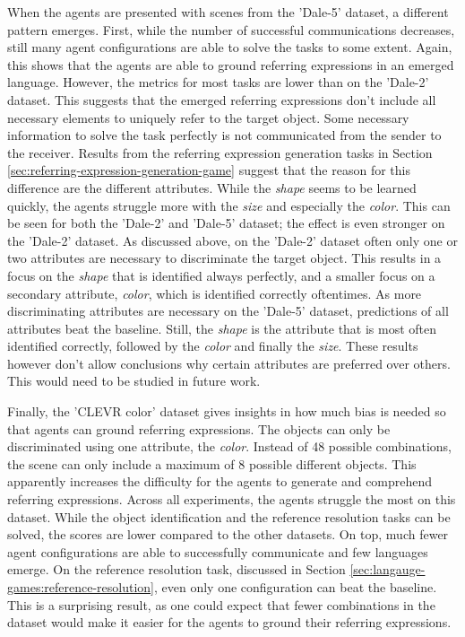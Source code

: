 When the agents are presented with scenes from the 'Dale-5' dataset, a different pattern emerges.
First, while the number of successful communications decreases, still many agent configurations are able to solve the tasks to some extent.
Again, this shows that the agents are able to ground referring expressions in an emerged language.
However, the metrics for most tasks are lower than on the 'Dale-2' dataset.
This suggests that the emerged referring expressions don't include all necessary elements to uniquely refer to the target object.
Some necessary information to solve the task perfectly is not communicated from the sender to the receiver.
Results from the referring expression generation tasks in Section \ref{sec:referring-expression-generation-game} suggest that the reason for this difference are the different attributes.
While the \emph{shape} seems to be learned quickly, the agents struggle more with the \emph{size} and especially the \emph{color}.
This can be seen for both the 'Dale-2' and 'Dale-5' dataset; the effect is even stronger on the 'Dale-2' dataset.
As discussed above, on the 'Dale-2' dataset often only one or two attributes are necessary to discriminate the target object.
This results in a focus on the \emph{shape} that is identified always perfectly, and a smaller focus on a secondary attribute, \emph{color}, which is identified correctly oftentimes.
As more discriminating attributes are necessary on the 'Dale-5' dataset, predictions of all attributes beat the baseline.
Still, the \emph{shape} is the attribute that is most often identified correctly, followed by the \emph{color} and finally the \emph{size}.
These results however don't allow conclusions why certain attributes are preferred over others.
This would need to be studied in future work.

Finally, the 'CLEVR color' dataset gives insights in how much bias is needed so that agents can ground referring expressions.
The objects can only be discriminated using one attribute, the \emph{color}.
Instead of 48 possible combinations, the scene can only include a maximum of 8 possible different objects.
This apparently increases the difficulty for the agents to generate and comprehend referring expressions.
Across all experiments, the agents struggle the most on this dataset.
While the object identification and the reference resolution tasks can be solved, the scores are lower compared to the other datasets.
On top, much fewer agent configurations are able to successfully communicate and few languages emerge.
On the reference resolution task, discussed in Section \ref{sec:langauge-games:reference-resolution}, even only one configuration can beat the baseline.
This is a surprising result, as one could expect that fewer combinations in the dataset would make it easier for the agents to ground their referring expressions.


